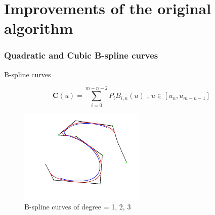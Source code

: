 \documentclass[english,10pt,presentation]{beamer}
\begin{document}
\section{Improvements of the original algorithm}
\label{sec-4}
\begin{frame}
\frametitle{Quadratic and Cubic B-spline curves}
\label{sec-4_1}
\begin{exampleblock}{B-spline curves}
\label{sec-4_1_1}

\begin{equation*}
  \mathbf{C}(u) =  \sum_{i=0}^{m-n-2} P_{i} B_{i,n}(u) \mbox{ , } u \in [u_{n},u_{m-n-1}]
\end{equation*}
\begin{figure}[htb]
\centering
\includegraphics[width=6cm,angle=0]{./bspline.jpg}
\caption{\label{fig: bspline}B-spline curves of degree = 1, 2, 3}
\end{figure}
\end{exampleblock}
\end{frame}
\end{document}
